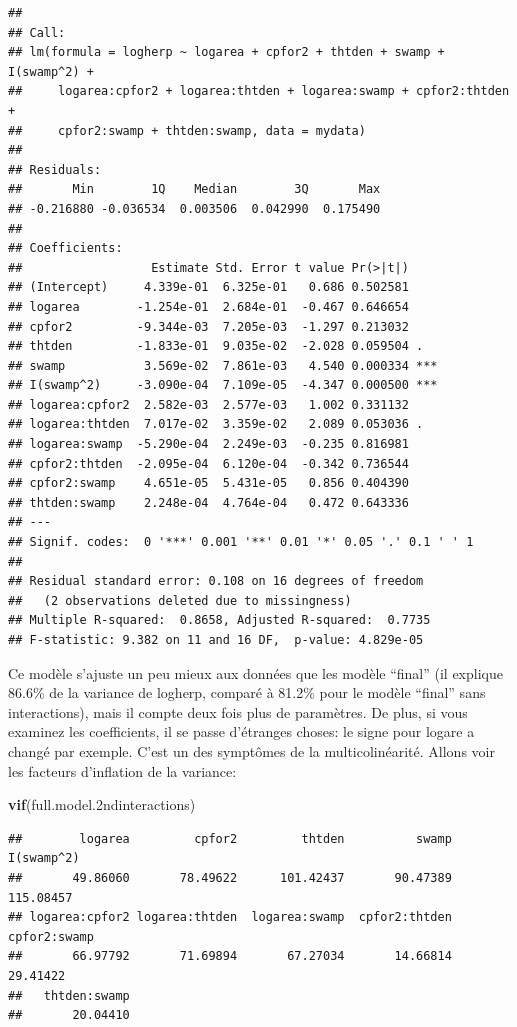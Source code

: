 \documentclass[12pt,]{book}
\newenvironment{Shaded}{\begin{snugshade}}{\end{snugshade}}
\newcommand{\FloatTok}[1]{\textcolor[rgb]{0.00,0.00,0.81}{#1}}
\newcommand{\KeywordTok}[1]{\textcolor[rgb]{0.13,0.29,0.53}{\textbf{#1}}}
\newcommand{\NormalTok}[1]{#1}
\begin{document}
\begin{verbatim}
## 
## Call:
## lm(formula = logherp ~ logarea + cpfor2 + thtden + swamp + I(swamp^2) + 
##     logarea:cpfor2 + logarea:thtden + logarea:swamp + cpfor2:thtden + 
##     cpfor2:swamp + thtden:swamp, data = mydata)
## 
## Residuals:
##       Min        1Q    Median        3Q       Max 
## -0.216880 -0.036534  0.003506  0.042990  0.175490 
## 
## Coefficients:
##                  Estimate Std. Error t value Pr(>|t|)    
## (Intercept)     4.339e-01  6.325e-01   0.686 0.502581    
## logarea        -1.254e-01  2.684e-01  -0.467 0.646654    
## cpfor2         -9.344e-03  7.205e-03  -1.297 0.213032    
## thtden         -1.833e-01  9.035e-02  -2.028 0.059504 .  
## swamp           3.569e-02  7.861e-03   4.540 0.000334 ***
## I(swamp^2)     -3.090e-04  7.109e-05  -4.347 0.000500 ***
## logarea:cpfor2  2.582e-03  2.577e-03   1.002 0.331132    
## logarea:thtden  7.017e-02  3.359e-02   2.089 0.053036 .  
## logarea:swamp  -5.290e-04  2.249e-03  -0.235 0.816981    
## cpfor2:thtden  -2.095e-04  6.120e-04  -0.342 0.736544    
## cpfor2:swamp    4.651e-05  5.431e-05   0.856 0.404390    
## thtden:swamp    2.248e-04  4.764e-04   0.472 0.643336    
## ---
## Signif. codes:  0 '***' 0.001 '**' 0.01 '*' 0.05 '.' 0.1 ' ' 1
## 
## Residual standard error: 0.108 on 16 degrees of freedom
##   (2 observations deleted due to missingness)
## Multiple R-squared:  0.8658, Adjusted R-squared:  0.7735 
## F-statistic: 9.382 on 11 and 16 DF,  p-value: 4.829e-05
\end{verbatim}

Ce modèle s'ajuste un peu mieux aux données que les modèle ``final'' (il explique 86.6\% de la variance de logherp, comparé à 81.2\% pour le modèle ``final'' sans interactions), mais il compte deux fois plus de paramètres. De plus, si vous examinez les coefficients, il se passe d'étranges choses: le signe pour logare a changé par exemple. C'est un des symptômes de la multicolinéarité. Allons voir les facteurs d'inflation de la variance:

\begin{Shaded}
\begin{Highlighting}[]
\KeywordTok{vif}\NormalTok{(full.model}\FloatTok{.2}\NormalTok{ndinteractions)}
\end{Highlighting}
\end{Shaded}

\begin{verbatim}
##        logarea         cpfor2         thtden          swamp     I(swamp^2) 
##       49.86060       78.49622      101.42437       90.47389      115.08457 
## logarea:cpfor2 logarea:thtden  logarea:swamp  cpfor2:thtden   cpfor2:swamp 
##       66.97792       71.69894       67.27034       14.66814       29.41422 
##   thtden:swamp 
##       20.04410
\end{verbatim}
\end{document}
